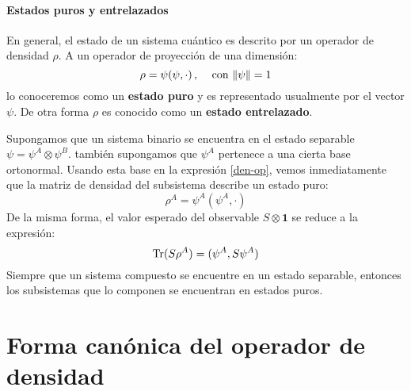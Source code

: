 \documentclass[12pt]{book}
\numberwithin{equation}{chapter}
\def\pr{\otimes}
\def\1{\mathbf{1}}
\def\Tr{\hbox{Tr}}
\begin{document}
\paragraph{Estados puros y entrelazados}
En general, el estado de un sistema cu\'antico es descrito por un operador de densidad $\rho$. A un operador de proyecci\'on de una dimensi\'on:
\begin{equation}
\rho= \psi (\psi, \cdot ) \,,\,\,\,\,\, \hbox{ con } \| \psi \|=1
\end{equation}
lo conoceremos como un {\bf estado puro} y es representado usualmente por el vector $\psi$. De otra forma $\rho$ es conocido como un {\bf estado entrelazado}.

\rightline{$\dag$}
\vspace{3 mm}

Supongamos que un sistema binario se encuentra en el estado separable $\psi = \psi^{A} \pr \psi^{B}$. tambi\'en supongamos que $\psi^{A}$ pertenece a una cierta base ortonormal. Usando esta base en la expresi\'on \eqref{den-op}, vemos inmediatamente que la matriz de densidad del subsistema describe un estado puro:
\begin{equation}
\rho^{A}= \psi^{A}( \psi^{A}, \cdot )
\end{equation}
De la misma forma, el valor esperado del observable $S \pr \1$ se reduce a la expresi\'on:
\begin{equation}
\Tr(S \rho^{A})= ( \psi^{A} , S \psi^{A} )
\end{equation}
Siempre que un sistema compuesto se encuentre en un estado separable, entonces los subsistemas que lo componen se encuentran en estados puros.

\section{Forma can\'onica del operador de densidad}
\end{document}

